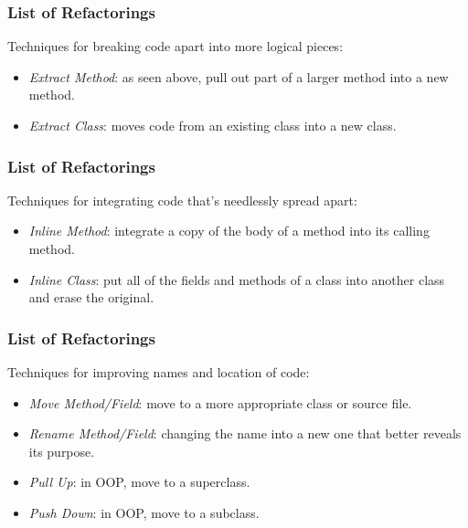 \begin{frame}
\frametitle{List of Refactorings}
\begin{changemargin}{1cm}

Techniques for breaking code apart into more logical pieces:
\begin{itemize}
\item \emph{Extract Method}: as seen above, pull out part of a larger method into a new method.
\item \emph{Extract Class}: moves code from an existing class into a new class.
\end{itemize}

\end{changemargin}
\end{frame}


\begin{frame}
\frametitle{List of Refactorings}
\begin{changemargin}{1cm}
Techniques for integrating code that's needlessly spread apart:
\begin{itemize}
\item \emph{Inline Method}: integrate a copy of the body of a method into its calling method.
\item \emph{Inline Class}: put all of the fields and methods of a class into another class and erase the original.
\end{itemize}

\end{changemargin}
\end{frame}


\begin{frame}
\frametitle{List of Refactorings}
\begin{changemargin}{1cm}

Techniques for improving names and location of code:
\begin{itemize}
\item \emph{Move Method/Field}: move to a more appropriate class or source file.
\item \emph{Rename Method/Field}: changing the name into a new one that better reveals its purpose.
\item \emph{Pull Up}: in OOP, move to a superclass.
\item \emph{Push Down}: in OOP, move to a subclass.
\end{itemize}


\end{changemargin}
\end{frame}


